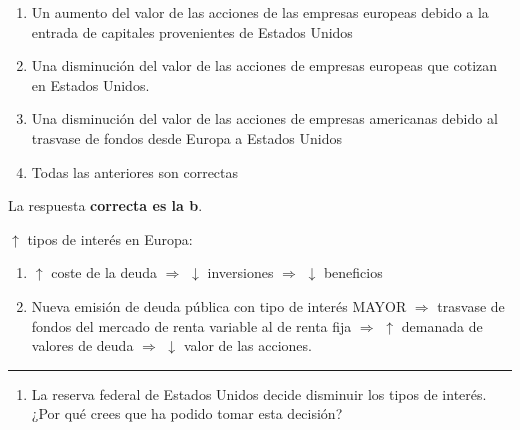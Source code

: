 \documentclass[
  letterpaper,
  DIV=11,
  numbers=noendperiod]{scrreprt}
\providecommand{\tightlist}{%
  \setlength{\itemsep}{0pt}\setlength{\parskip}{0pt}}\usepackage{longtable,booktabs,array}
\begin{document}
\begin{enumerate}
\def\labelenumi{\alph{enumi})}
\item
  Un aumento del valor de las acciones de las empresas europeas debido a
  la entrada de capitales provenientes de Estados Unidos
\item
  Una disminución del valor de las acciones de empresas europeas que
  cotizan en Estados Unidos.
\item
  Una disminución del valor de las acciones de empresas americanas
  debido al trasvase de fondos desde Europa a Estados Unidos
\item
  Todas las anteriores son correctas
\end{enumerate}

\begin{tcolorbox}[enhanced jigsaw, left=2mm, opacityback=0, colback=white, breakable, arc=.35mm, bottomrule=.15mm, rightrule=.15mm, toprule=.15mm, leftrule=.75mm, colframe=quarto-callout-tip-color-frame]
\begin{minipage}[t]{5.5mm}
\textcolor{quarto-callout-tip-color}{\faLightbulb}
\end{minipage}%
\begin{minipage}[t]{\textwidth - 5.5mm}

La respuesta \textbf{correcta es la b}.

\(\uparrow\) tipos de interés en Europa:

\begin{enumerate}
\def\labelenumi{\alph{enumi})}
\item
  \(\uparrow\) coste de la deuda \(\Rightarrow\) \(\downarrow\)
  inversiones \(\Rightarrow\) \(\downarrow\) beneficios
\item
  Nueva emisión de deuda pública con tipo de interés MAYOR
  \(\Rightarrow\) trasvase de fondos del mercado de renta variable al de
  renta fija \(\Rightarrow\) \(\uparrow\) demanada de valores de deuda
  \(\Rightarrow\) \(\downarrow\) valor de las acciones.
\end{enumerate}

\end{minipage}%
\end{tcolorbox}

\begin{center}\rule{0.5\linewidth}{0.5pt}\end{center}

\begin{enumerate}
\def\labelenumi{\arabic{enumi}.}
\setcounter{enumi}{20}
\tightlist
\item
  La reserva federal de Estados Unidos decide disminuir los tipos de
  interés. ¿Por qué crees que ha podido tomar esta decisión?
\end{enumerate}
\end{document}
